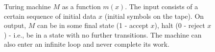 \begin{figure}
\centering



\caption{Turing machine $M$ as a function $m(x)$. The input consists of a certain sequence of initial data $x$ (initial symbols on the tape). On output, $M$ can be in some final state (1 - accept $x$), halt (0 - reject $x$) - i.e., be in a state with no further transitions. The machine can also enter an infinite loop and never complete its work.} 
\label{figAddAlgoDecidability}
\end{figure}
